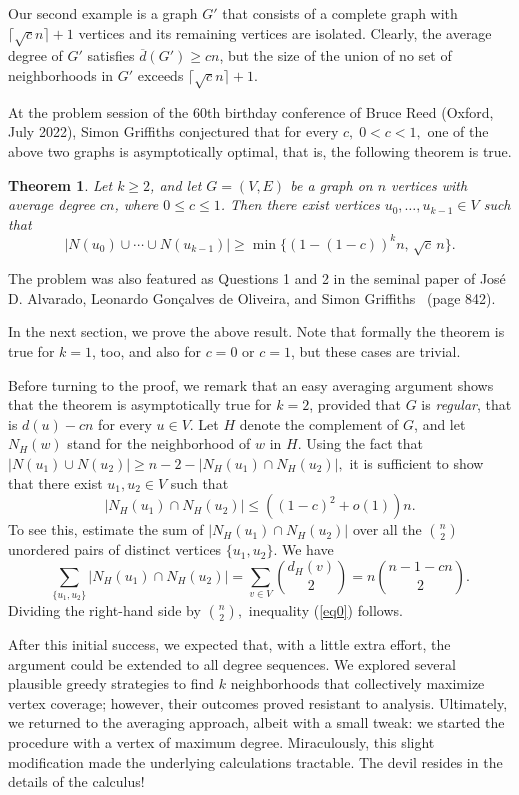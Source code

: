 \documentclass[12pt]{article}
\theoremstyle{plain}
\newtheorem{theorem}{Theorem}
\theoremstyle{definition}
\theoremstyle{remark}
\begin{document}
Our second example is a graph $G'$ that consists of a complete graph with $\lceil\sqrt{c}n\rceil+1$ vertices and its remaining vertices are isolated. Clearly, the average degree of $G'$ satisfies $\overline{d}(G')\ge cn$, but the size of the union of no set of neighborhoods in $G'$ exceeds $\lceil\sqrt{c}n\rceil+1$.
\smallskip

At the problem session of the 60th birthday conference of Bruce Reed (Oxford, July 2022), Simon Griffiths conjectured that for every $c, \; 0<c<1,$ one of the above two graphs is asymptotically optimal, that is, the following theorem is true.

\begin{theorem}\label{main}
Let $k\ge 2$, and let $G=(V,E)$ be a graph on $n$ vertices with average degree $cn$, where $0\le c\le 1$.
Then there exist vertices $u_0,\dots,u_{k-1}\in V$ such that
\[
\bigl|N(u_0)\cup\cdots\cup N(u_{k-1})\bigr|
\ge
\min\bigl\{(1-(1-c))^k n,\,\sqrt c\,n\bigr\}.
\]
\end{theorem}

The problem was also featured as Questions 1 and 2 in the seminal paper of Jos\'e D. Alvarado, Leonardo Gon\c{c}alves de Oliveira, and Simon Griffiths~\cite{AlGG} (page 842).
\smallskip

In the next section, we prove the above result. Note that formally the theorem is true for $k=1$, too, and also for $c=0$ or $c=1$, but these cases are trivial.
\medskip

Before turning to the proof, we remark that an easy averaging argument shows that the theorem is asymptotically true for $k=2$, provided that $G$ is \emph{regular}, that is $d(u)-cn$ for every $u\in V$. Let $H$ denote the complement of $G$, and let $N_H(w)$ stand for the neighborhood of $w$ in $H$. Using the fact that $|N(u_1)\cup N(u_2)|\ge n-2-|N_H(u_1)\cap N_H(u_2)|,$ it is sufficient to show that there exist $u_1,u_2\in V$ such that
\begin{equation}\label{eq0}
|N_H(u_1)\cap N_H(u_2)|\le ((1-c)^2+o(1))n.
\end{equation}
To see this, estimate the sum of $|N_H(u_1)\cap N_H(u_2)|$ over all the $\binom{n}{2}$ unordered pairs of distinct vertices $\{u_1,u_2\}.$  We have
\[
\sum_{\{u_1,u_2\}}|N_H(u_1)\cap N_H(u_2)|=\sum_{v\in V}\binom{d_H(v)}{2}=n\binom{n-1-cn}{2}.
\]
Dividing the right-hand side by $\binom{n}{2},$ inequality (\ref{eq0}) follows.
\smallskip

After this initial success, we expected that, with a little extra effort, the argument could be extended to all degree sequences. We explored several plausible greedy strategies to find $k$ neighborhoods that collectively maximize vertex coverage; however, their outcomes proved resistant to analysis. Ultimately, we returned to the averaging approach, albeit with a small tweak: we started the procedure with a vertex of maximum degree. Miraculously, this slight modification made the underlying calculations tractable. The devil resides in the details of the calculus!
\end{document}
